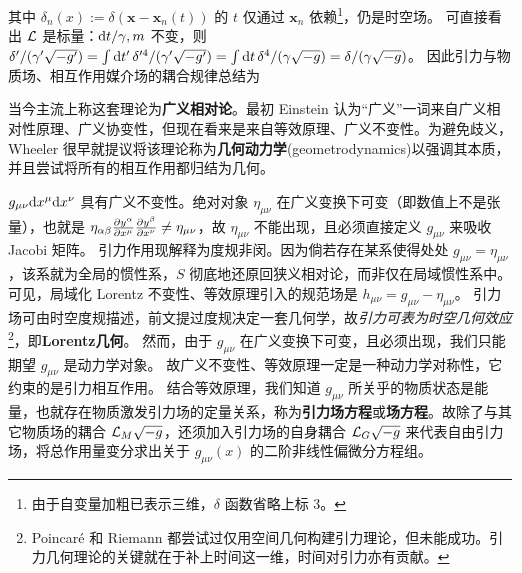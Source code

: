 其中 $\delta_n(x):=\delta(\bm x-\bm x_n(t))$ 的 $t$ 仅通过 $\bm x_n$ 依赖\footnote{由于自变量加粗已表示三维，$\delta$ 函数省略上标 3。}，仍是时空场。
可直接看出 $\mathcal{L}$ 是标量：$\dd t/\gamma, m$ 不变，则 $\delta'/(\gamma'\sqrt{-g'}) = \int\dd{t'}\delta'^4/(\gamma'\sqrt{-g'}) = \int\dd {t}\delta^4/(\gamma\sqrt{-g})=\delta/(\gamma\sqrt{-g})$。
因此引力与物质场、相互作用媒介场的耦合规律总结为
\begin{center}
\end{center}
当今主流上称这套理论为\textbf{广义相对论}。最初 Einstein 认为“广义”一词来自广义相对性原理、广义协变性，但现在看来是来自等效原理、广义不变性。为避免歧义，Wheeler 很早就提议将该理论称为\textbf{几何动力学}(geometrodynamics)以强调其本质，并且尝试将所有的相互作用都归结为几何。

$g_{\mu\nu}\dd x^\mu \dd x^\nu$ 具有广义不变性。绝对对象 $\eta_{\mu\nu}$ 在广义变换下可变（即数值上不是张量），也就是 $\eta_{\alpha\beta}\pdv{y^\alpha}{x^\mu}\pdv{ y^\beta}{x^\nu}\ne\eta_{\mu\nu}$，故 $\eta_{\mu\nu}$ 不能出现，且必须直接定义 $g_{\mu\nu}$ 来吸收 Jacobi 矩阵。
引力作用现解释为度规非闵。因为倘若存在某系使得处处 $g_{\mu\nu}=\eta_{\mu\nu}$，该系就为全局的惯性系，$S$ 彻底地还原回狭义相对论，而非仅在局域惯性系中。
可见，局域化 Lorentz 不变性、等效原理引入的规范场是 $h_{\mu\nu}=g_{\mu\nu}-\eta_{\mu\nu}$。
引力场可由时空度规描述，前文提过度规决定一套几何学，故\emph{引力可表为时空几何效应}\footnote{Poincaré 和 Riemann 都尝试过仅用空间几何构建引力理论，但未能成功。引力几何理论的关键就在于补上时间这一维，时间对引力亦有贡献。}，即\textbf{Lorentz几何}。
然而，由于 $g_{\mu\nu}$ 在广义变换下可变，且必须出现，我们只能期望 $g_{\mu\nu}$ 是动力学对象。
故广义不变性、等效原理一定是一种动力学对称性，它约束的是引力相互作用。
结合等效原理，我们知道 $g_{\mu\nu}$ 所关乎的物质状态是能量，也就存在物质激发引力场的定量关系，称为\textbf{引力场方程}或\textbf{场方程}。故除了与其它物质场的耦合 $\mathcal{L}_M\sqrt{-g}$，还须加入引力场的自身耦合 $\mathcal{L}_G\sqrt{-g}$ 来代表自由引力场，将总作用量变分求出关于 $g_{\mu\nu}(x)$ 的二阶非线性偏微分方程组。

